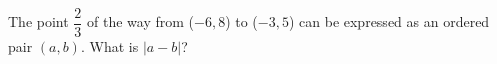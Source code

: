The point $\dfrac{2}{3}$ of the way from ($-6, 8$) to ($-3, 5$) can be expressed as an ordered pair $(a, b)$. What is $|a - b|$?

